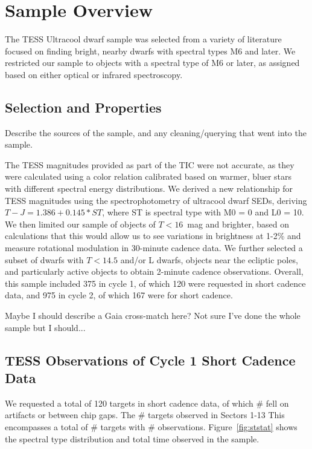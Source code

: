 \documentclass{aastex62}
\begin{document}
\section{Sample Overview} \label{sec:sample}
The TESS Ultracool dwarf sample was selected from a variety of literature focused on finding bright, nearby dwarfs with spectral types M6 and later. We restricted our sample to objects with a spectral type of M6 or later, as assigned based on either optical or infrared spectroscopy. 

\subsection{Selection and Properties} \label{subsec:samsel}
Describe the sources of the sample, and any cleaning/querying that went into the sample. 

The TESS magnitudes provided as part of the TIC were not accurate, as they were calculated using a color relation calibrated based on warmer, bluer stars with different spectral energy distributions. We derived a new relationship for TESS magnitudes using the spectrophotometry of ultracool dwarf SEDs, deriving $T-J = 1.386 + 0.145*ST$, where ST is spectral type with M0 = 0 and L0 = 10. We then limited our sample of objects of $T < 16$~mag and brighter, based on calculations that this would allow us to see variations in brightness at 1-2\% and measure rotational modulation in 30-minute cadence data. We further selected a subset of dwarfs with $T < 14.5$ and/or L dwarfs, objects near the ecliptic poles, and particularly active objects to obtain 2-minute cadence observations. Overall, this sample included 375 in cycle 1, of which 120 were requested in short cadence data, and 975 in cycle 2, of which 167 were for short cadence. 

Maybe I should describe a Gaia cross-match here? Not sure I've done the whole sample but I should... 

\subsection{TESS Observations of Cycle 1 Short Cadence Data}
We requested a total of 120 targets in short cadence data, of which \# fell on artifacts or between chip gaps. The \# targets observed in Sectors 1-13 This encompasses a total of \# targets with \# observations. Figure~\ref{fig:ststat} shows the spectral type distribution and total time observed in the sample. 
\end{document}
